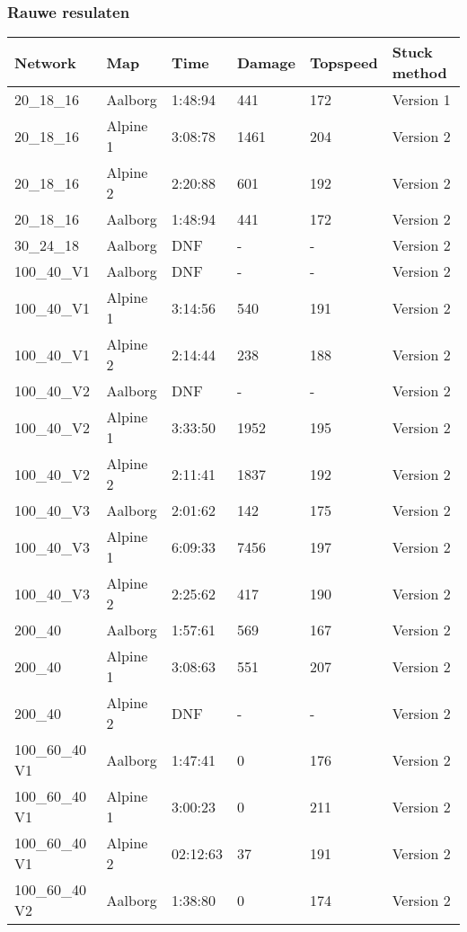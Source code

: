 \subsubsection*{Rauwe resulaten}
\begin{table}[H]
\begin{tabular}{llllll}
 \textbf{Network} & \textbf{Map} & \textbf{Time} & \textbf{Damage} & \textbf{Topspeed}  & \textbf{Stuck method} \\ \hline
 20\_18\_16  & Aalborg & 1:48:94 & 441 & 172 & Version 1 \\
 20\_18\_16 & Alpine 1 & 3:08:78  & 1461 & 204 & Version 2    \\
 20\_18\_16 & Alpine 2 & 2:20:88  & 601 & 192 & Version 2    \\
 20\_18\_16  & Aalborg & 1:48:94 & 441 & 172 & Version 2 \\ \hline
 30\_24\_18  & Aalborg &  DNF & - & - & Version 2 \\ \hline
 100\_40\_V1 & Aalborg & DNF & - & - & Version 2 \\
 100\_40\_V1 & Alpine 1 & 3:14:56 & 540 & 191 & Version 2 \\
 100\_40\_V1 & Alpine 2 & 2:14:44 & 238 & 188 & Version 2 \\ \hline
 100\_40\_V2 & Aalborg & DNF & - & - & Version 2 \\
 100\_40\_V2 & Alpine 1 & 3:33:50 & 1952 & 195 & Version 2 \\
 100\_40\_V2 & Alpine 2 & 2:11:41 & 1837 & 192 & Version 2 \\ \hline
 100\_40\_V3 & Aalborg & 2:01:62 & 142 & 175 & Version 2 \\
 100\_40\_V3 & Alpine 1 & 6:09:33 & 7456 & 197 & Version 2 \\
 100\_40\_V3 & Alpine 2 & 2:25:62 & 417 & 190 & Version 2 \\ \hline
 200\_40  & Aalborg &  1:57:61 & 569 & 167 & Version 2 \\ 
 200\_40 & Alpine 1 & 3:08:63 & 551 & 207 & Version 2    \\
 200\_40 & Alpine 2 & DNF & - & - & Version 2   \\ \hline 
 100\_60\_40 V1 &  Aalborg & 1:47:41 & 0 & 176 & Version 2 \\
 100\_60\_40 V1 & Alpine 1& 3:00:23 & 0 & 211 & Version 2 \\  
 100\_60\_40 V1 & Alpine 2 & 02:12:63 & 37 & 191 & Version 2   \\ \hline
 100\_60\_40 V2 & Aalborg & 1:38:80  & 0 & 174 & Version 2   \\ 

\end{tabular}
\end{table}
